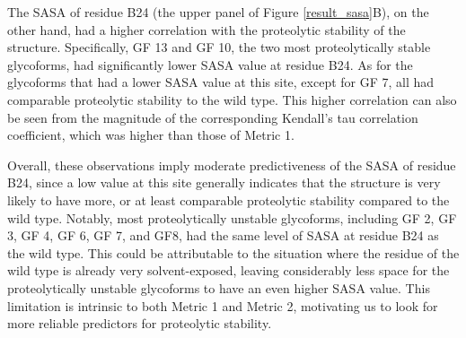 \documentclass[9pt]{elife}
\begin{document}
The SASA of residue B24 (the upper panel of Figure \ref{result_sasa}B), on the other hand, had a higher correlation with the proteolytic stability of the structure. Specifically, GF 13 and GF 10, the two most proteolytically stable glycoforms, had significantly lower SASA value at residue B24. As for the glycoforms that had a lower SASA value at this site, except for GF 7, all had comparable proteolytic stability to the wild type. This higher correlation can also be seen from the magnitude of the corresponding Kendall's tau correlation coefficient, which was higher than those of Metric 1.

Overall, these observations imply moderate predictiveness of the SASA of residue B24, since a low value at this site generally indicates that the structure is very likely to have more, or at least comparable proteolytic stability compared to the wild type. Notably, most proteolytically unstable glycoforms, including GF 2, GF 3, GF 4, GF 6, GF 7, and GF8, had the same level of SASA at residue B24 as the wild type. This could be attributable to the situation where the residue of the wild type is already very solvent-exposed, leaving considerably less space for the proteolytically unstable glycoforms to have an even higher SASA value. This limitation is intrinsic to both Metric 1 and Metric 2, motivating us to look for more reliable predictors for proteolytic stability. 
\end{document}
